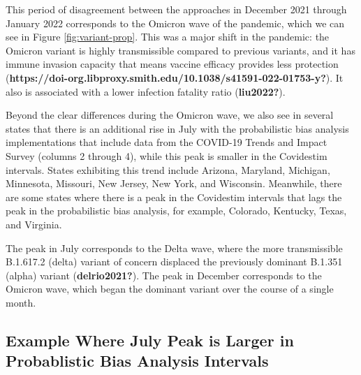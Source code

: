 \documentclass[12pt,twoside]{smiththesis}
\begin{document}
This period of disagreement between the approaches in December 2021 through January 2022 corresponds to the Omicron wave of the pandemic, which we can see in Figure \ref{fig:variant-prop}. This was a major shift in the pandemic: the Omicron variant is highly transmissible compared to previous variants, and it has immune invasion capacity that means vaccine efficacy provides less protection (\textbf{https://doi-org.libproxy.smith.edu/10.1038/s41591-022-01753-y?}). It also is associated with a lower infection fatality ratio (\textbf{liu2022?}).

Beyond the clear differences during the Omicron wave, we also see in several states that there is an additional rise in July with the probabilistic bias analysis implementations that include data from the COVID-19 Trends and Impact Survey (columns 2 through 4), while this peak is smaller in the Covidestim intervals. States exhibiting this trend include Arizona, Maryland, Michigan, Minnesota, Missouri, New Jersey, New York, and Wisconsin. Meanwhile, there are some states where there is a peak in the Covidestim intervals that lags the peak in the probabilistic bias analysis, for example, Colorado, Kentucky, Texas, and Virginia.

The peak in July corresponds to the Delta wave, where the more transmissible B.1.617.2 (delta) variant of concern displaced the previously dominant B.1.351 (alpha) variant (\textbf{delrio2021?}). The peak in December corresponds to the Omicron wave, which began the dominant variant over the course of a single month.

\hypertarget{example-where-july-peak-is-larger-in-probablistic-bias-analysis-intervals}{%
\subsection{Example Where July Peak is Larger in Probablistic Bias Analysis Intervals}\label{example-where-july-peak-is-larger-in-probablistic-bias-analysis-intervals}}
\end{document}
